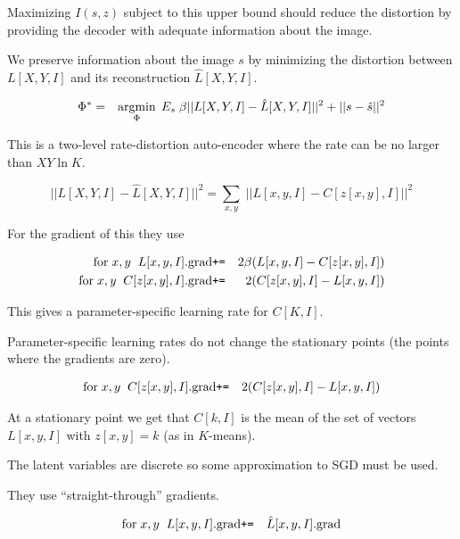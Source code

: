 {\vfill
Maximizing $I(s,z)$ subject to this upper bound should reduce the distortion by providing the decoder with adequate information
about the image.


We preserve information about the image $s$ by minimizing the distortion between $L[X,Y,I]$ and its reconstruction $\hat{L}[X,Y,I]$.

\vfill
\begin{eqnarray*}
\Phi^* & = & \operatorname*{argmin}_\Phi \;E_s\; \beta||L[X,Y,I] - \hat{L}[X,Y,I]||^2 + ||s -\hat{s}||^2
\end{eqnarray*}

\vfill
This is a two-level rate-distortion auto-encoder where the rate can be no larger than $XY\ln K$.


$$||L[X,Y,I] - \hat{L}[X,Y,I]||^2 = \sum_{x,y}\;||L[x,y,I] - C[z[x,y],I]||^2$$

\vfill
For the gradient of this they use

\begin{eqnarray*}
\mathrm{for}\;x,y\;\;L[x,y,I].\mathrm{grad} & \mbox{\tt +=} & 2\beta({L}[x,y,I]- C[z[x,y],I]) \\
\mathrm{for}\;x,y\;\;C[z[x,y],I].\mathrm{grad} & \mbox{\tt +=} & 2(C[z[x,y],I] - L[x,y,I])
\end{eqnarray*}

\vfill
This gives a parameter-specific learning rate for $C[K,I]$.

\vfill
Parameter-specific learning rates do not change the stationary points (the points where the gradients are zero).


\begin{eqnarray*}
\mathrm{for}\;x,y\;\;C[z[x,y],I].\mathrm{grad} & \mbox{\tt +=} & 2(C[z[x,y],I] - L[x,y,I])
\end{eqnarray*}

\vfill
At a stationary point we get that $C[k,I]$ is the mean of the set of vectors $L[x,y,I]$ with $z[x,y] = k$ (as in $K$-means).


The latent variables are discrete so some approximation to SGD must be used.

\vfill
They use ``straight-through'' gradients.

\begin{eqnarray*}
\mathrm{for}\;x,y\;\;L[x,y,I].\mathrm{grad} & \mbox{\tt +=} & \hat{L}[x,y,I].\mathrm{grad}
\end{eqnarray*}

}
